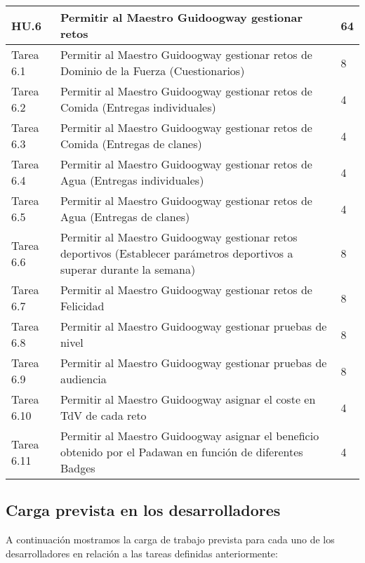 \newpage

\begin{table}[h]
	\centering
	\begin{tabular}{| p{2.3cm} | p{6.7cm} | p{2cm} |}
		\rowcolor[HTML]{329A9D} 
		{\color[HTML]{FFFFFF} \textbf{HU.6}} & {\color[HTML]{FFFFFF} \textbf{Permitir al Maestro Guidoogway gestionar retos}} & {\color[HTML]{FFFFFF} \textbf{64}}  \\ \hline
		Tarea 6.1 & Permitir al Maestro Guidoogway gestionar retos de Dominio de la Fuerza (Cuestionarios) & 8 \\ \hline
		Tarea 6.2 & Permitir al Maestro Guidoogway gestionar retos de Comida (Entregas individuales) & 4 \\ \hline
		Tarea 6.3 & Permitir al Maestro Guidoogway gestionar retos de Comida (Entregas de clanes) & 4 \\ \hline
		Tarea 6.4 & Permitir al Maestro Guidoogway gestionar retos de Agua (Entregas individuales) & 4 \\ \hline
		Tarea 6.5 & Permitir al Maestro Guidoogway gestionar retos de Agua (Entregas de clanes) & 4 \\ \hline
		Tarea 6.6 & Permitir al Maestro Guidoogway gestionar retos deportivos (Establecer parámetros deportivos a superar durante la semana)& 8 \\ \hline
		Tarea 6.7 & Permitir al Maestro Guidoogway gestionar retos de Felicidad & 8 \\ \hline
		Tarea 6.8 & Permitir al Maestro Guidoogway gestionar pruebas de nivel & 8 \\ \hline
		Tarea 6.9 & Permitir al Maestro Guidoogway gestionar pruebas de audiencia & 8 \\ \hline
		Tarea 6.10 & Permitir al Maestro Guidoogway asignar el coste en TdV de cada reto & 4 \\ \hline
		Tarea 6.11 & Permitir al Maestro Guidoogway asignar el beneficio obtenido por el Padawan en función de diferentes Badges & 4 \\ \hline
	\end{tabular}
\end{table}

\newpage
\subsection{Carga prevista en los desarrolladores}

A continuación mostramos la carga de trabajo prevista para cada uno de los desarrolladores en relación a las tareas definidas anteriormente:

